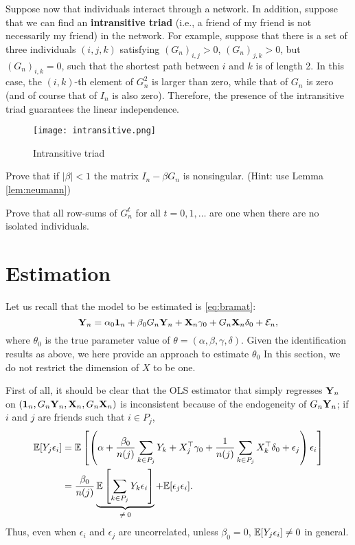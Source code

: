 \documentclass[11pt, A4paper, openany, uplatex]{book}
\begin{document}
\begin{example}\upshape
	Suppose now that individuals interact through a network. 
	In  addition, suppose that we can find an \textbf{intransitive triad} (i.e., a friend of my friend is not necessarily my friend) in the network.
	For example, suppose that there is a set of three individuals $(i, j, k)$ satisfying $(G_n)_{i,j} > 0$, $(G_n)_{j,k} > 0$, but $(G_n)_{i,k} = 0$, such that the shortest path between $i$ and $k$ is of length 2.
	In this case, the $(i, k)$-th element of $G_n^2$ is larger than zero, while that of $G_n$ is zero (and of course that of $I_n$ is also zero).
	Therefore, the presence of the intransitive triad guarantees the linear independence.
	\begin{figure}[h!]
	\begin{center}
		\texttt{[image: intransitive.png]}
		\caption{Intransitive triad}
	\end{center}
	\end{figure}
\end{example}

\hrulefill
\begin{exercise}\upshape
	Prove that if $|\beta| < 1$ the matrix $I_n - \beta G_n$ is nonsingular. (Hint: use Lemma \ref{lem:neumann})
\end{exercise}
\begin{exercise}\upshape
Prove that all row-sums of $G_n^t$ for all $t = 0, 1, \ldots$ are one when there are no isolated individuals.
\end{exercise}


\section{Estimation}\label{sec:estimation_soc}

Let us recall that the model to be estimated is \eqref{eq:bramat}:
\[
	\mathbf{Y}_n = \alpha_0 \mathbf{1}_n + \beta_0 G_n \mathbf{Y}_n + \mathbf{X}_n \gamma_0 +  G_n \mathbf{X}_n \delta_0 + \mathcal{E}_n,
\]
where $\theta_0$ is the true parameter value of $\theta = (\alpha, \beta, \gamma, \delta)$.
Given the identification results as above, we here provide an approach to estimate $\theta_0$
In this section, we do not restrict the dimension of $X$ to be one.

First of all, it should be clear that the OLS estimator that simply regresses $\mathbf{Y}_n$ on $(\mathbf{1}_n, G_n \mathbf{Y}_n, \mathbf{X}_n, G_n \mathbf{X}_n)$ is inconsistent because of the endogeneity of $G_n \mathbf{Y}_n$; if $i$ and $j$ are friends such that $i \in P_j$,
\begin{align*}
	\mathbb{E}[Y_j \epsilon_i]
	& = \mathbb{E}\left[\left(\alpha +\frac{\beta_0}{ n(j)} \sum_{k \in P_j} Y_k + X_j^\top \gamma_0 + \frac{1}{n(j)} \sum_{k \in P_j} X_k^\top \delta_0 + \epsilon_j\right) \epsilon_i\right] \\
	& = \frac{\beta_0}{ n(j)} \underbrace{\mathbb{E}\left[ \sum_{k \in P_j} Y_k \epsilon_i\right]}_{\neq \: 0} + \mathbb{E}[\epsilon_j \epsilon_i ].
\end{align*}
Thus, even when $\epsilon_i$ and $\epsilon_j$ are uncorrelated, unless $\beta_0 = 0$, $\mathbb{E}[Y_j \epsilon_i] \neq 0$ in general.
\end{document}
